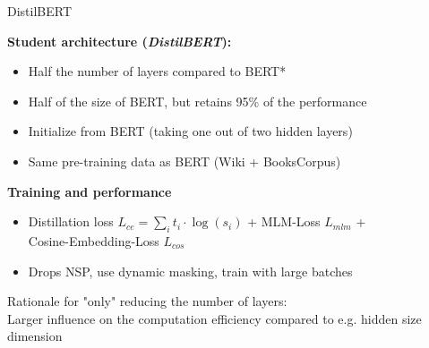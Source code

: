 \begin{frame}{DistilBERT \href{https://arxiv.org/pdf/1910.01108.pdf}{}}

\textbf{Student architecture (\textit{DistilBERT}):}

\begin{itemize}
	\item Half the number of layers compared to BERT*
 	\item Half of the size of BERT, but retains 95\% of the performance
	\item Initialize from BERT (taking one out of two hidden layers)
	\item Same pre-training data as BERT (Wiki + BooksCorpus)
\end{itemize}

\vspace{.3cm}

\textbf{Training and performance}

\begin{itemize}
	\item Distillation loss $L_{ce} = \sum_i t_i \cdot \log(s_i)$ + MLM-Loss $L_{mlm}$ + \\
				Cosine-Embedding-Loss $L_{cos}$
	\item Drops NSP, use dynamic masking, train with large batches
\end{itemize}

\vspace{1cm}

{\footnotesize *Rationale for "only" reducing the number of layers:\\
Larger influence on the computation efficiency compared to e.g. hidden size dimension}
	
\end{frame}


